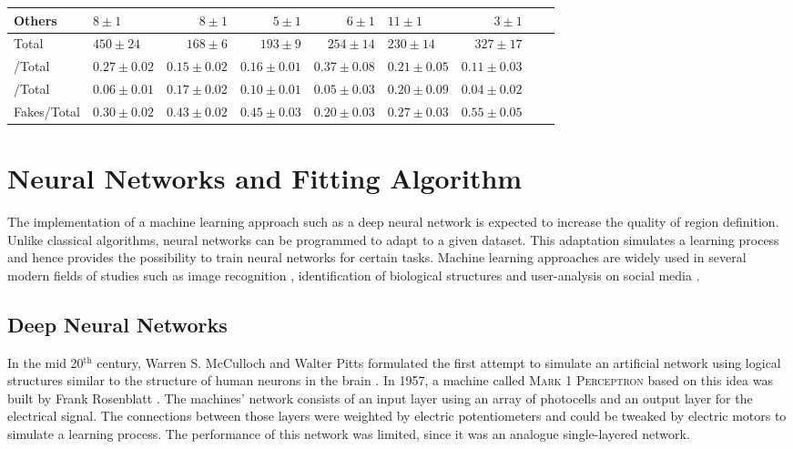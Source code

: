 \documentclass[bachelor,oneside, BCOR10mm,
			ngerman,english  %
]{GAUBM}
\begin{document}
\begin{table}
{\begin{tabular}{lVrrrVrrr}
			Others				& $8\pm1$ 	& $8\pm1$ 	& $5\pm1$		& $6\pm1$ 	& $11\pm1$ & $3\pm1$\\
			\hline
			Total				& $450\pm24$ & $168\pm6$ & $193\pm9$ 	& $254\pm14$ & $230\pm14$ & $327\pm17$\\
			\hline
			\ttbarZ/Total		& $0.27\pm0.02$ & $0.15\pm0.02$ & $0.16\pm0.01$ & $0.37\pm0.08$ & $0.21\pm0.05$ & $0.11\pm0.03$\\
			\ttbarW/Total		& $0.06\pm0.01$ & $0.17\pm0.02$ & $0.10\pm0.01$ & $0.05\pm0.03$ & $0.20\pm0.09$ & $0.04\pm0.02$\\
			Fakes/Total			& $0.30\pm0.02$ & $0.43\pm0.02$ & $0.45\pm0.03$ & $0.20\pm0.03$ & $0.27\pm0.03$ & $0.55\pm0.05$\\
		\end{tabular}%
	}
	\label{tab:Yields}
\end{table}


\chapter{Neural Networks and Fitting Algorithm}
\label{ch:neural_networks}
The implementation of a machine learning approach such as a deep neural network is expected to increase the quality of region definition. Unlike classical algorithms, neural networks can be programmed to adapt to a given dataset. This adaptation simulates a learning process and hence provides the possibility to train neural networks for certain tasks. Machine learning approaches are widely used in several modern fields of studies such as image recognition \cite{nn_application01}, identification of biological structures \cite{nn_application02} and user-analysis on social media \cite{nn_application03}.

\section{Deep Neural Networks}
In the mid 20$^\text{th}$ century, Warren S. McCulloch and Walter Pitts formulated the first attempt to simulate an artificial network using logical structures similar to the structure of human neurons in the brain \cite{nn_hist01}. In 1957, a machine called \textsc{Mark 1 Perceptron} based on this idea was built by Frank Rosenblatt \cite{nn_hist02}. The machines' network consists of an input layer using an array of photocells and an output layer for the electrical signal. The connections between those layers were weighted by electric potentiometers and could be tweaked by electric motors to simulate a learning process. The performance of this network was limited, since it was an analogue single-layered network. 
\end{document}
